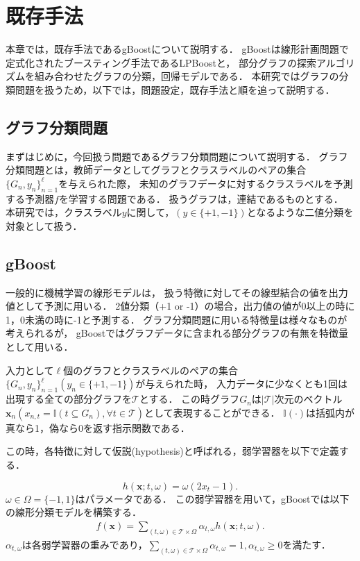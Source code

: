 \chapter{既存手法}
本章では，既存手法であるgBoost\cite{gBoost}について説明する．
gBoostは線形計画問題で定式化されたブースティング手法であるLPBoost\cite{lpboost}と，
部分グラフの探索アルゴリズムを組み合わせたグラフの分類，回帰モデルである．
本研究ではグラフの分類問題を扱うため，以下では，問題設定，既存手法と順を追って説明する．

\section{グラフ分類問題}
まずはじめに，今回扱う問題であるグラフ分類問題について説明する．
グラフ分類問題とは，教師データとしてグラフとクラスラベルのペアの集合$\{G_n, y_n\}^{\ell}_{n=1}$を与えられた際，
未知のグラフデータに対するクラスラベルを予測する予測器$f$を学習する問題である．
扱うグラフは，連結であるものとする．
本研究では，クラスラベル$y$に関して，$(y \in \{+1, -1\})$となるような二値分類を対象として扱う．

\section{gBoost}
一般的に機械学習の線形モデルは，
扱う特徴に対してその線型結合の値を出力値として予測に用いる．
2値分類（+1 or -1）の場合，出力値の値が0以上の時に1，0未満の時に-1と予測する．
グラフ分類問題に用いる特徴量は様々なものが考えられるが，
gBoostではグラフデータに含まれる部分グラフの有無を特徴量として用いる．

入力として$\ell$個のグラフとクラスラベルのペアの集合
$\{G_n, y_n\}^{\ell}_{n=1} (y_n \in \{+1, -1\})$が与えられた時，
入力データに少なくとも1回は出現する全ての部分グラフを$\mathcal{T}$とする．
この時グラフ$G_n$は$|\mathcal{T}|$次元のベクトル$\bm{x}_n(x_{n,t} = \mathbb{I}(t \subseteq G_n), \forall t \in \mathcal{T})$として表現することができる．
$\mathbb{I}(\cdot)$は括弧内が真なら1，偽なら0を返す指示関数である．

この時，各特徴に対して仮説(hypothesis)と呼ばれる，弱学習器を以下で定義する．

\begin{equation*}
	h(\bm{x};t,\omega) = \omega (2x_t - 1).
\end{equation*}
$\omega \in \Omega = \{-1,1\}$はパラメータである．
この弱学習器を用いて，gBoostでは以下の線形分類モデルを構築する．
\begin{align}
	\label{eq:linear}
	f(\bm{x}) = \sum_{(t,\omega) \in \mathcal{T}\times \Omega} \alpha_{t,\omega} h(\bm{x};t,\omega).
\end{align}
$\alpha_{t,\omega}$は各弱学習器の重みであり，$\sum_{(t,\omega) \in \mathcal{T}\times \Omega} \alpha_{t,\omega}=1,\alpha_{t,\omega} \geq 0$を満たす．

